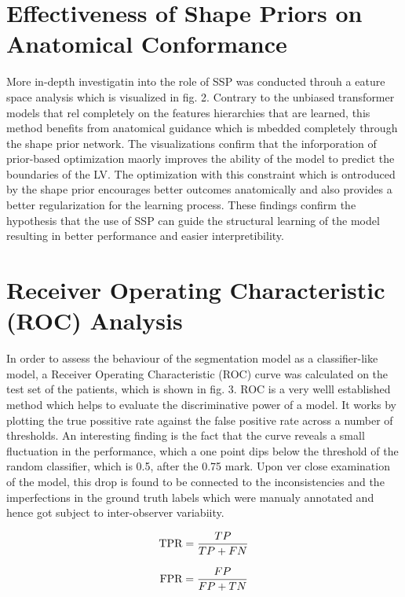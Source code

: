 \section{Effectiveness of Shape Priors on Anatomical Conformance}
More in-depth investigatin into the role of SSP was conducted throuh a eature space analysis which is visualized in fig. 2. Contrary to the unbiased transformer models that rel completely on the features hierarchies that are learned, this method benefits from anatomical guidance which is mbedded completely through the shape prior network. The visualizations confirm that the inforporation of prior-based optimization maorly improves the ability of the model to predict the boundaries of the LV. The optimization with this constraint which is ontroduced by the shape prior encourages better outcomes anatomically and also provides a better regularization for the learning process. These findings confirm the hypothesis that the use of SSP can guide the structural learning of the model resulting in better performance and easier interpretibility.

\section{Receiver Operating Characteristic (ROC) Analysis}
In order to assess the behaviour of the segmentation model as a classifier-like model, a Receiver Operating Characteristic (ROC) curve was calculated on the test set of the patients, which is shown in fig. 3. ROC is a very welll established method which helps to evaluate the discriminative power of a model. It works by plotting the true possitive rate against the false positive rate across a number of thresholds. An interesting finding is the fact that the curve reveals a small fluctuation in the performance, which a one point dips below the threshold of the random classifier, which is 0.5, after the 0.75 mark. Upon ver close examination of the model, this drop is found to be connected to the  inconsistencies and the imperfections in the ground truth labels which were manualy annotated and hence got subject to inter-observer variabiity.

\begin{equation}
\addcontentsline{equ}{equations}{\protect\numberline{\theequation}True Positive Rate}
    \text{TPR} = \frac{TP}{TP + FN}
\end{equation}
    
\begin{equation}
    \addcontentsline{equ}{equations}{\protect\numberline{\theequation}False Positive Rate}
    \text{FPR} = \frac{FP}{FP + TN}
\end{equation}

